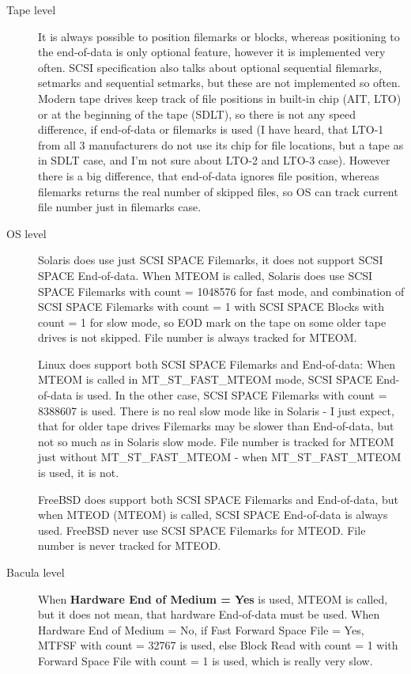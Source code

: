 \begin{description}
\item[Tape level]
  It is always possible to position filemarks or blocks, whereas
  positioning to the end-of-data is only optional feature, however it is
  implemented very often.  SCSI specification also talks about optional
  sequential filemarks, setmarks and sequential setmarks, but these are not
  implemented so often.  Modern tape drives keep track of file positions in
  built-in chip (AIT, LTO) or at the beginning of the tape (SDLT), so there
  is not any speed difference, if end-of-data or filemarks is used (I have
  heard, that LTO-1 from all 3 manufacturers do not use its chip for file
  locations, but a tape as in SDLT case, and I'm not sure about LTO-2 and
  LTO-3 case).  However there is a big difference, that end-of-data ignores
  file position, whereas filemarks returns the real number of skipped
  files, so OS can track current file number just in filemarks case.

\item[OS level]
  Solaris does use just SCSI SPACE Filemarks, it does not support SCSI
  SPACE End-of-data.  When MTEOM is called, Solaris does use SCSI SPACE
  Filemarks with count = 1048576 for fast mode, and combination of SCSI
  SPACE Filemarks with count = 1 with SCSI SPACE Blocks with count = 1 for
  slow mode, so EOD mark on the tape on some older tape drives is not
  skipped.  File number is always tracked for MTEOM.

  Linux does support both SCSI SPACE Filemarks and End-of-data: When MTEOM
  is called in MT\_ST\_FAST\_MTEOM mode, SCSI SPACE End-of-data is used.
  In the other case, SCSI SPACE Filemarks with count =
  8388607 is used.
  There is no real slow mode like in Solaris - I just expect, that for
  older tape drives Filemarks may be slower than End-of-data, but not so
  much as in Solaris slow mode.  File number is tracked for MTEOM just
  without MT\_ST\_FAST\_MTEOM - when MT\_ST\_FAST\_MTEOM is used, it is not.

  FreeBSD does support both SCSI SPACE Filemarks and End-of-data, but when
  MTEOD (MTEOM) is called, SCSI SPACE End-of-data is always used.  FreeBSD
  never use SCSI SPACE Filemarks for MTEOD. File number is never tracked
  for MTEOD.

\item[Bacula level]
  When {\bf Hardware End of Medium = Yes} is used, MTEOM is called, but it
  does not mean, that hardware End-of-data must be used.  When Hardware End
  of Medium = No, if Fast Forward Space File = Yes, MTFSF with count =
  32767 is used, else Block Read with count = 1 with Forward Space File
  with count = 1 is used, which is really very slow.


\end{description}
